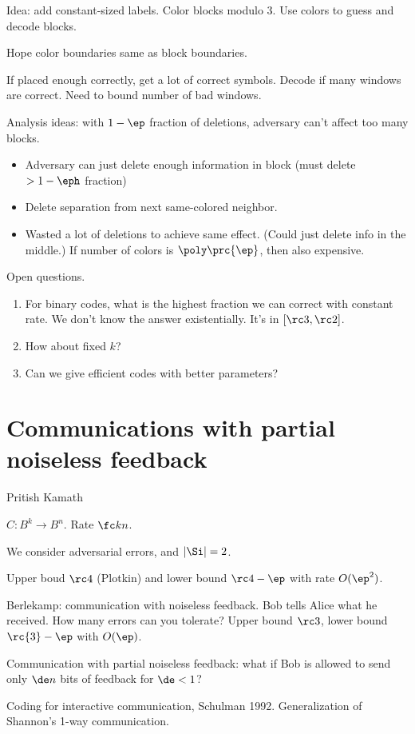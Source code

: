 Idea: add constant-sized labels. Color blocks modulo 3. Use colors to guess and decode blocks.

Hope color boundaries same as block boundaries.

If placed enough correctly, get a lot of correct symbols. Decode if many windows are correct. Need to bound number of bad windows.

Analysis ideas: with $1-\ep$ fraction of deletions, adversary can't affect too many blocks. 
\begin{itemize}
\item
Adversary can just delete enough information in block (must delete $>1-\eph$ fraction)
\item
Delete separation from next same-colored neighbor.
\item
Wasted a lot of deletions to achieve same effect. (Could just delete info in the middle.) If number of colors is $\poly\prc{\ep}$, then also expensive.
\end{itemize}

Open questions.

\begin{enumerate}
\item
For binary codes, what is the highest fraction we can correct with constant rate. We don't know the answer existentially. It's in $[\rc3,\rc2]$.
\item
How about fixed $k$?
\item
Can we give efficient codes with better parameters?
\end{enumerate}

\section{Communications with partial noiseless feedback}
Pritish Kamath

$C:B^k\to B^n$. Rate $\fc kn$.

We consider adversarial errors, and $|\Si|=2$.

Upper boud $\rc4$ (Plotkin) and lower bound $\rc4-\ep$ with rate $O(\ep^2)$.

Berlekamp: communication with noiseless feedback. Bob tells Alice what he received. How many errors can you tolerate? Upper bound $\rc3$, lower bound $\rc{3}-\ep$ with $O(\ep)$.

Communication with partial noiseless feedback: what if Bob is allowed to send only $\de n$ bits of feedback for $\de<1$?

Coding for interactive communication, Schulman 1992. Generalization of Shannon's 1-way communication.

